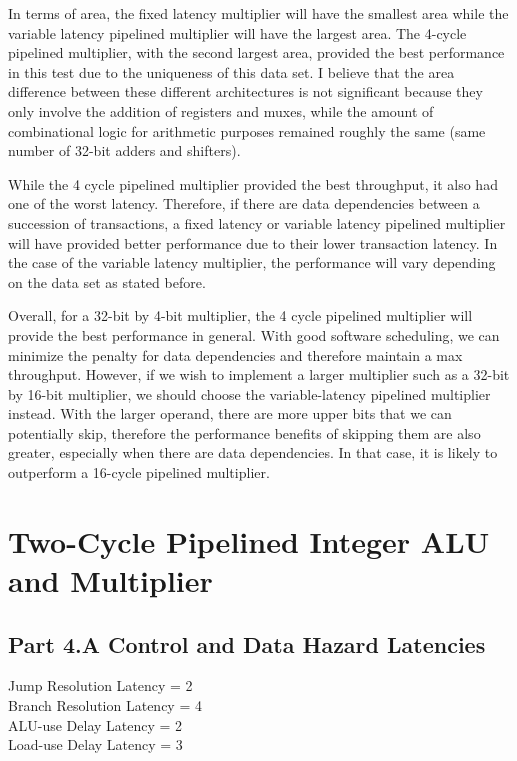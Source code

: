 \documentclass[10pt]{article}
\begin{document}
In terms of area, the fixed latency multiplier will have the smallest area while the variable latency pipelined multiplier will have the largest area. The 4-cycle pipelined multiplier, with the second largest area, provided the best performance in this test due to the uniqueness of this data set. I believe that the area difference between these different architectures is not significant because they only involve the addition of registers and muxes, while the amount of combinational logic for arithmetic purposes remained roughly the same (same number of 32-bit adders and shifters). 

While the 4 cycle pipelined multiplier provided the best throughput, it also had one of the worst latency. Therefore, if there are data dependencies between a succession of transactions, a fixed latency or variable latency pipelined multiplier will have provided better performance due to their lower transaction latency. In the case of the variable latency multiplier, the performance will vary depending on the data set as stated before. 

Overall, for a 32-bit by 4-bit multiplier, the 4 cycle pipelined multiplier will provide the best performance in general. With good software scheduling, we can minimize the penalty for data dependencies and therefore maintain a max throughput. However, if we wish to implement a larger multiplier such as a 32-bit by 16-bit multiplier, we should choose the variable-latency pipelined multiplier instead. With the larger operand, there are more upper bits that we can potentially skip, therefore the performance benefits of skipping them are also greater, especially when there are data dependencies. In that case, it is likely to outperform a 16-cycle pipelined multiplier.

\cleardoublepage
\section{Two-Cycle Pipelined Integer ALU and Multiplier}
\subsection{Part 4.A Control and Data Hazard Latencies}
Jump Resolution Latency = 2\\
Branch Resolution Latency = 4\\
ALU-use Delay Latency = 2\\
Load-use Delay Latency = 3\\
\end{document}
